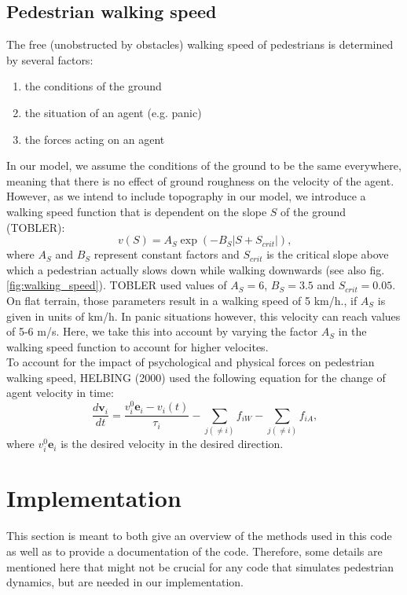 \documentclass[11pt]{article}
\begin{document}
\subsection{Pedestrian walking speed}
The free (unobstructed by obstacles) walking speed of pedestrians is determined by several factors:
\begin{enumerate}
\item the conditions of the ground
\item the situation of an agent (e.g. panic)
\item the forces acting on an agent
\end{enumerate}
In our model, we assume the conditions of the ground to be the same everywhere, meaning that there is no effect of ground roughness on the velocity of the agent. However, as we intend to include topography in our model, we introduce a walking speed function that is dependent on the slope $S$ of the ground (TOBLER):
\begin{equation}
	v(S) = A_{S} \exp{\left( -B_S | S + S_{crit} |  \right)}\mbox{,}
\end{equation}
where $A_S$ and $B_{S}$ represent constant factors and $S_{crit}$ is the critical slope above which a pedestrian actually slows down while walking downwards (see also fig.\ref{fig:walking_speed}). TOBLER used values of $A_S = 6$, $B_S = 3.5$ and $S_{crit} = 0.05$. On flat terrain, those parameters result in a walking speed of 5 km/h., if $A_S$ is given in units of km/h. In panic situations however, this velocity can reach values of 5-6 m/s. Here, we take this into account by varying the factor $A_S$ in the walking speed function to account for higher velocites.\\
To account for the impact of psychological and physical forces on pedestrian walking speed, HELBING (2000) used the following equation for the change of agent velocity in time:
\begin{equation}
	\frac{d \mathbf{v}_i}{dt} = \frac{v_i^0\mathbf{e}_i - v_i(t)}{\tau_i} - \sum_{j(\ne i)}f_{iW} - \sum_{j(\ne i)}f_{iA}\mbox{,}
\end{equation}
where $v_i^0\mathbf{e}_i$ is the desired velocity in the desired direction.

\section{Implementation}\label{sec:implementation}

This section is meant to both give an overview of the methods used in this code as well as to provide a documentation of the code. Therefore, some details are mentioned here that might not be crucial for any code that simulates pedestrian dynamics, but are needed in our implementation. 
\end{document}
